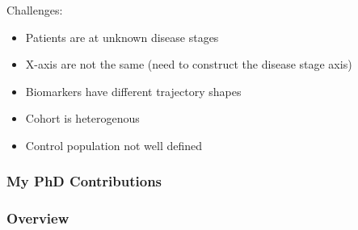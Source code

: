 \documentclass[8pt,xcolor=table]{beamer}
\begin{document}
\begin{frame}
\begin{figure}
\begin{overprint}
\begin{center}
\begin{tikzpicture}[scale=1,auto,swap]
 \end{tikzpicture}
 \end{center}
 
 \begin{center} 
 \end{center}
\end{overprint}
\end{figure}

 Challenges:
\begin{itemize}
  \item Patients are at unknown disease stages
  \item X-axis are not the same (need to construct the disease stage axis)
  \item Biomarkers have different trajectory shapes
  \item Cohort is heterogenous
  \item Control population not well defined
\end{itemize}
\vspace{1em}

\end{frame}




\begin{frame}[label=current]
\frametitle{My PhD Contributions}

\begin{figure}
\centering


\ovEBM
\ovVWDPM

\ovDKT
\ovTadpole

\ovPainter

\end{figure}

\end{frame}



\begin{frame}
\frametitle{Overview}


\begin{figure}
\centering

\ovEBM
{
\ovVWDPM

\ovDKT
\ovTadpole

\ovPainter
}

\end{figure}
\end{frame}
\end{document}
